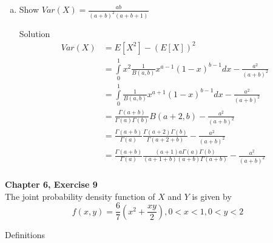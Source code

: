 \documentclass{article}
\begin{document}
\begin{spacing}{1.1}
\begin{homeworkProblem}
\begin{enumerate}[(a)]
\begin{homeworkSection}{Solution}
\begin{align*}
            \frac{ \Gamma( a + 1) \Gamma( b)}{ \Gamma( a + 1 + b)} \\
          &= \frac{ \Gamma( a + b)}{ \Gamma( a)} 
            \frac{ \Gamma( a + 1)}{ \Gamma( a + 1 + b)} \\
          &= \frac{ \Gamma( a + b)}{ \Gamma( a)} 
            \frac{ a\Gamma( a)}{ (a + b)\Gamma( a + b)} \\
          &= \frac{ a}{ (a + b)} \\
        \end{align*}
      \end{homeworkSection}
    \item Show $Var( X) = \frac{ ab}{ (a + b)^2 (a + b + 1)}$
      \begin{homeworkSection}{Solution}
        \begin{align*}
          Var( X) &= E[ X^2] - (E[ X])^2\\
          &= \int\limits_0^1 x^2 \frac{ 1}{ B(a, b)} x^{a - 1} (1 - x)^{b - 1} dx 
            - \frac{ a^2}{ (a + b)^2}\\
          &= \int\limits_0^1 \frac{ 1}{ B(a, b)} x^{a + 1} (1 - x)^{b - 1} dx 
            - \frac{ a^2}{ (a + b)^2}\\
          &= \frac{ \Gamma( a + b)}{ \Gamma( a) \Gamma( b)} B(a + 2, b)
            - \frac{ a^2}{ (a + b)^2}\\
          &= \frac{ \Gamma( a + b)}{ \Gamma( a)}
            \frac{ \Gamma( a + 2) \Gamma( b)}{ \Gamma( a + 2 + b)}
            - \frac{ a^2}{ (a + b)^2}\\
          &= \frac{ \Gamma( a + b)}{ \Gamma( a) }
            \frac{ (a + 1) a \Gamma( a) \Gamma( b)}{ ( a + 1 + b)( a + b)\Gamma( a + b)}
            - \frac{ a^2}{ (a + b)^2}\\
        \end{align*}
      \end{homeworkSection}
  \end{enumerate}
\end{homeworkProblem}

\newpage
\begin{homeworkProblem}
  {\bf Chapter 6, Exercise 9}\\
  The joint probability density function of $X$ and $Y$ is given by
  \[f( x, y) = \frac{ 6}{ 7} \left( x^2 + \frac{ x y}{ 2}\right), 
    0 < x < 1, 0 < y < 2\]

  \begin{homeworkSection}{Definitions}


\end{homeworkSection}
\end{homeworkProblem}
\end{spacing}
\end{document}
